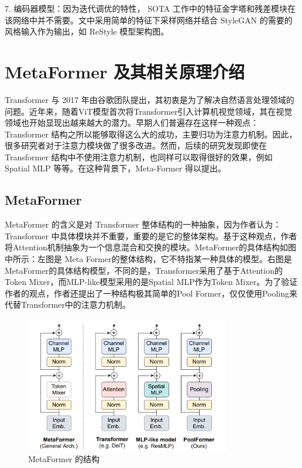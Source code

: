 7. 编码器模型：因为迭代调优的特性， SOTA 工作中的特征金字塔和残差模块在该网络中并不需要。文中采用简单的特征下采样网络并结合 StyleGAN 的需要的风格输入作为输出，如 ReStyle 模型架构图。

\section{MetaFormer 及其相关原理介绍}

Transformer 与 2017 年由谷歌团队提出，其初衷是为了解决自然语言处理领域的问题。近年来，随着ViT模型首次将Transformer引入计算机视觉领域，其在视觉领域也开始显现出越来越大的潜力。早期人们普遍存在这样一种观点：Transformer 结构之所以能够取得这么大的成功，主要归功为注意力机制。因此，很多研究者对于注意力模块做了很多改进。然而，后续的研究发现即使在 Transformer 结构中不使用注意力机制，也同样可以取得很好的效果，例如 Spatial MLP 等等。在这种背景下，Meta-Former 得以提出。

\subsection{MetaFormer}

MetaFormer 的含义是对 Transformer 整体结构的一种抽象，因为作者认为：Transformer 中具体模块并不重要，重要的是它的整体架构。基于这种观点，作者将Attention机制抽象为一个信息混合和交换的模块。MetaFormer的具体结构如图中所示：左图是 Meta Former的整体结构，它不特指某一种具体的模型。右图是MetaFormer的具体结构模型，不同的是，Transformer采用了基于Attention的Token Mixer，而MLP-like模型采用的是Spatial MLP作为Token Mixer。为了验证作者的观点，作者还提出了一种结构极其简单的Pool Former，仅仅使用Pooling来代替Transformer中的注意力机制。

\begin{figure}[htb]
\centering 
\includegraphics[width=0.8\textwidth]{img/m3p5.png} 
\caption{MetaFormer 的结构}
\label{Test}
\end{figure}


